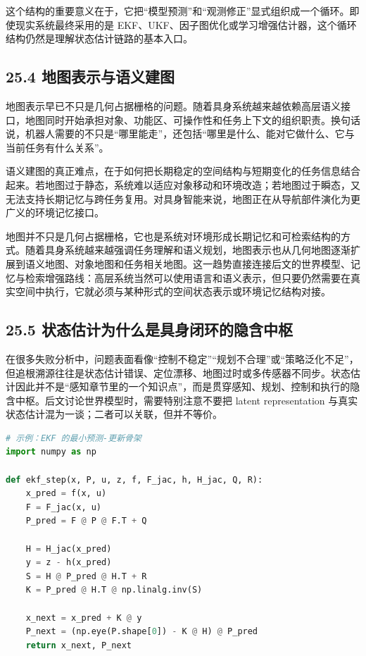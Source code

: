 这个结构的重要意义在于，它把“模型预测”和“观测修正”显式组织成一个循环。即使现实系统最终采用的是 EKF、UKF、因子图优化或学习增强估计器，这个循环结构仍然是理解状态估计链路的基本入口。

\subsection*{25.4 地图表示与语义建图}


地图表示早已不只是几何占据栅格的问题。随着具身系统越来越依赖高层语义接口，地图同时开始承担对象、功能区、可操作性和任务上下文的组织职责。换句话说，机器人需要的不只是“哪里能走”，还包括“哪里是什么、能对它做什么、它与当前任务有什么关系”。

语义建图的真正难点，在于如何把长期稳定的空间结构与短期变化的任务信息结合起来。若地图过于静态，系统难以适应对象移动和环境改造；若地图过于瞬态，又无法支持长期记忆与跨任务复用。对具身智能来说，地图正在从导航部件演化为更广义的环境记忆接口。

地图并不只是几何占据栅格，它也是系统对环境形成长期记忆和可检索结构的方式。随着具身系统越来越强调任务理解和语义规划，地图表示也从几何地图逐渐扩展到语义地图、对象地图和任务相关地图。这一趋势直接连接后文的世界模型、记忆与检索增强路线：高层系统当然可以使用语言和语义表示，但只要仍然需要在真实空间中执行，它就必须与某种形式的空间状态表示或环境记忆结构对接。

\subsection*{25.5 状态估计为什么是具身闭环的隐含中枢}


在很多失败分析中，问题表面看像“控制不稳定”“规划不合理”或“策略泛化不足”，但追根溯源往往是状态估计错误、定位漂移、地图过时或多传感器不同步。状态估计因此并不是“感知章节里的一个知识点”，而是贯穿感知、规划、控制和执行的隐含中枢。后文讨论世界模型时，需要特别注意不要把 latent representation 与真实状态估计混为一谈；二者可以关联，但并不等价。

\begin{lstlisting}[language=python]
# 示例：EKF 的最小预测-更新骨架
import numpy as np

def ekf_step(x, P, u, z, f, F_jac, h, H_jac, Q, R):
    x_pred = f(x, u)
    F = F_jac(x, u)
    P_pred = F @ P @ F.T + Q

    H = H_jac(x_pred)
    y = z - h(x_pred)
    S = H @ P_pred @ H.T + R
    K = P_pred @ H.T @ np.linalg.inv(S)

    x_next = x_pred + K @ y
    P_next = (np.eye(P.shape[0]) - K @ H) @ P_pred
    return x_next, P_next
\end{lstlisting}

